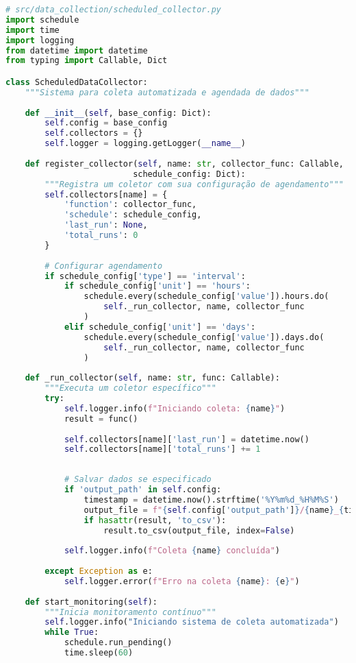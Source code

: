 \begin{pythonbox}
\begin{lstlisting}[language=Python]
# src/data_collection/scheduled_collector.py
import schedule
import time
import logging
from datetime import datetime
from typing import Callable, Dict

class ScheduledDataCollector:
    """Sistema para coleta automatizada e agendada de dados"""
    
    def __init__(self, base_config: Dict):
        self.config = base_config
        self.collectors = {}
        self.logger = logging.getLogger(__name__)
        
    def register_collector(self, name: str, collector_func: Callable, 
                          schedule_config: Dict):
        """Registra um coletor com sua configuração de agendamento"""
        self.collectors[name] = {
            'function': collector_func,
            'schedule': schedule_config,
            'last_run': None,
            'total_runs': 0
        }
        
        # Configurar agendamento
        if schedule_config['type'] == 'interval':
            if schedule_config['unit'] == 'hours':
                schedule.every(schedule_config['value']).hours.do(
                    self._run_collector, name, collector_func
                )
            elif schedule_config['unit'] == 'days':
                schedule.every(schedule_config['value']).days.do(
                    self._run_collector, name, collector_func
                )
                
    def _run_collector(self, name: str, func: Callable):
        """Executa um coletor específico"""
        try:
            self.logger.info(f"Iniciando coleta: {name}")
            result = func()
            
            self.collectors[name]['last_run'] = datetime.now()
            self.collectors[name]['total_runs'] += 1
\end{lstlisting}
\end{pythonbox}

\begin{pythonbox}
\begin{lstlisting}[language=Python]
            
            # Salvar dados se especificado
            if 'output_path' in self.config:
                timestamp = datetime.now().strftime('%Y%m%d_%H%M%S')
                output_file = f"{self.config['output_path']}/{name}_{timestamp}.csv"
                if hasattr(result, 'to_csv'):
                    result.to_csv(output_file, index=False)
                    
            self.logger.info(f"Coleta {name} concluída")
            
        except Exception as e:
            self.logger.error(f"Erro na coleta {name}: {e}")
    
    def start_monitoring(self):
        """Inicia monitoramento contínuo"""
        self.logger.info("Iniciando sistema de coleta automatizada")
        while True:
            schedule.run_pending()
            time.sleep(60)
\end{lstlisting}
\end{pythonbox}


